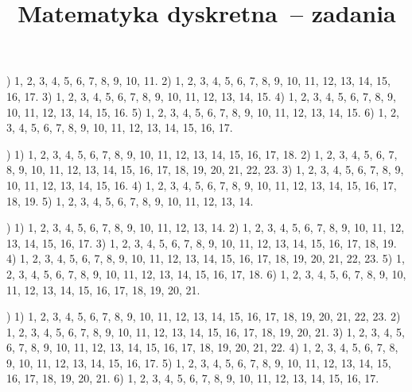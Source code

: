 \documentclass[a4paper,11pt]{article}
\title{Matematyka dyskretna~-- zadania}
\begin{document}





\maketitle %







\noindent
{}) 1, 2, 3, 4, 5, 6, 7, 8, 9, 10, 11. 2) 1, 2, 3, 4,
5, 6, 7, 8, 9, 10, 11, 12, 13, 14, 15, 16, 17. 3) 1, 2, 3, 4, 5, 6, 7,
8, 9, 10, 11, 12, 13, 14, 15. 4) 1, 2, 3, 4, 5, 6, 7, 8, 9, 10, 11, 12,
13, 14, 15, 16. 5) 1, 2, 3, 4, 5, 6, 7, 8, 9, 10, 11, 12, 13, 14, 15.
6) 1, 2, 3, 4, 5, 6, 7, 8, 9, 10, 11, 12, 13, 14, 15, 16, 17.

\vspace{\spaceFour}



\noindent
{}) 1) 1, 2, 3, 4, 5, 6, 7, 8, 9, 10, 11, 12, 13, 14, 15, 16,
17, 18. 2) 1, 2, 3, 4, 5, 6, 7, 8, 9, 10, 11, 12, 13, 14, 15, 16, 17, 18,
19, 20, 21, 22, 23. 3) 1, 2, 3, 4, 5, 6, 7, 8, 9, 10, 11, 12, 13, 14, 15,
16. 4) 1, 2, 3, 4, 5, 6, 7, 8, 9, 10, 11, 12, 13, 14, 15, 16, 17, 18, 19.
5) 1, 2, 3, 4, 5, 6, 7, 8, 9, 10, 11, 12, 13, 14.

\vspace{\spaceFour}



\noindent
{}) 1) 1, 2, 3, 4, 5, 6, 7, 8, 9, 10, 11, 12, 13, 14.
2) 1, 2, 3, 4, 5, 6, 7, 8, 9, 10, 11, 12, 13, 14, 15, 16, 17.
3) 1, 2, 3, 4, 5, 6, 7, 8, 9, 10, 11, 12, 13, 14, 15, 16, 17, 18, 19.
4) 1, 2, 3, 4, 5, 6, 7, 8, 9, 10, 11, 12, 13, 14, 15, 16, 17, 18, 19,
20, 21, 22, 23. 5) 1, 2, 3, 4, 5, 6, 7, 8, 9, 10, 11, 12, 13, 14, 15,
16, 17, 18. 6) 1, 2, 3, 4, 5, 6, 7, 8, 9, 10, 11, 12, 13, 14, 15, 16,
17, 18, 19, 20, 21.

\vspace{\spaceFour}



\noindent
{}) 1) 1, 2, 3, 4, 5, 6, 7, 8, 9, 10, 11, 12, 13, 14, 15,
16, 17, 18, 19, 20, 21, 22, 23. 2) 1, 2, 3, 4, 5, 6, 7, 8, 9, 10, 11,
12, 13, 14, 15, 16, 17, 18, 19, 20, 21. 3) 1, 2, 3, 4, 5, 6, 7, 8, 9,
10, 11, 12, 13, 14, 15, 16, 17, 18, 19, 20, 21, 22.
4) 1, 2, 3, 4, 5, 6, 7, 8, 9, 10, 11, 12, 13, 14, 15, 16, 17.
5) 1, 2, 3, 4, 5, 6, 7, 8, 9, 10, 11, 12, 13, 14, 15, 16, 17, 18, 19,
20, 21. 6) 1, 2, 3, 4, 5, 6, 7, 8, 9, 10, 11, 12, 13, 14, 15, 16, 17.
\end{document}
